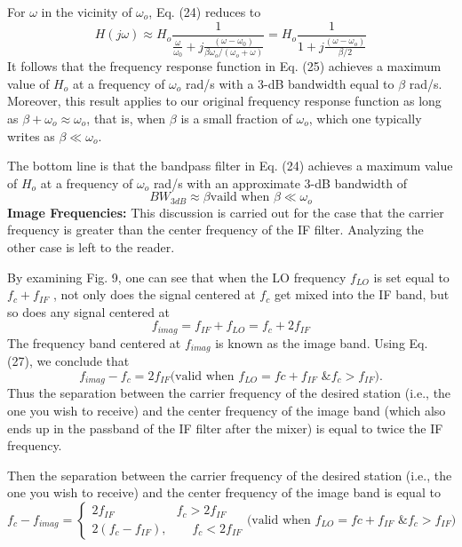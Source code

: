 \documentclass[12pt]{article}
\begin{document}
For $\omega$ in the vicinity of $\omega_o$, Eq. (24) reduces to
\begin{equation}
H(j\omega)\approx H_o\frac{1}{\frac{\omega}{\omega_0}+j\frac{(\omega-\omega_0)}{\beta\omega_o/(\omega_o+\omega)}}=H_o\frac{1}{1+j\frac{(\omega-\omega_o)}{\beta/2}}
\end{equation}
It follows that the frequency response function in Eq. (25) achieves a maximum value of $H_o$ at a frequency
of $\omega_o$ rad/s with a 3-dB bandwidth equal to $\beta$ rad/s. Moreover, this result applies to our original frequency
response function as long as $\beta+\omega_o\approx\omega_o$, that is, when $\beta$ is a small fraction of $\omega_o$, which one typically writes as $\beta\ll\omega_o$.
\par The bottom line is that the bandpass filter in Eq. (24) achieves a maximum value of $H_o$ at a frequency
of $\omega_o$ rad/s with an approximate 3-dB bandwidth of
\begin{equation}
BW_{3dB}\approx\beta\text{vaild when } \beta\ll\omega_o
\end{equation}
\textbf{Image Frequencies:} This discussion is carried out for the case that the carrier frequency is greater than
the center frequency of the IF filter. Analyzing the other case is left to the reader.
\par By examining Fig. 9, one can see that when the LO frequency $f_{LO}$ is set equal to $f_c+f_{IF}$ , not only
does the signal centered at $f_c$ get mixed into the IF band, but so does any signal centered at
\begin{equation}
f_{imag}=f_{IF}+f_{LO}=f_c+2f_{IF}
\end{equation}
The frequency band centered at $f_{imag}$ is known as the image band. Using Eq. (27), we conclude that
\begin{equation}
f_{imag}-f_c=2f_{IF}\text{(valid when }f_{LO}=f{c}+f_{IF}\text{ \& }f_c>f_{IF}).
\end{equation}
Thus the separation between the carrier frequency of the desired station (i.e., the one you wish to receive)
and the center frequency of the image band (which also ends up in the passband of the IF filter after the
mixer) is equal to twice the IF frequency.
\par Then the separation between the carrier frequency of the desired station (i.e., the one you wish to receive)
and the center frequency of the image band is equal to
\begin{equation}
f_c-f_{imag}=\begin{cases}
2f_{IF}\qquad\qquad\quad f_c>2f_{IF}\\2(f_c-f_{IF}),\qquad f_c<2f_{IF}
\end{cases}
\text{(valid when }f_{LO}=f{c}+f_{IF}\text{ \& }f_c>f_{IF})
\end{equation}
\end{document}
